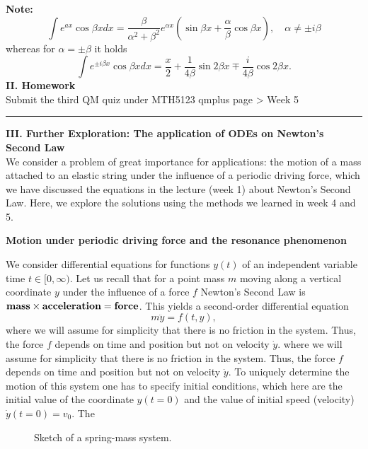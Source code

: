 \documentclass[11pt,a4paper,twoside]{article}
\begin{document}
	\textbf{Note:}
	$$
	\int e^{ax}\cos \beta x dx = \frac{\beta}{\alpha^2+\beta^2}e^{\alpha x}\left(\sin \beta x + \frac{\alpha}{\beta}\cos \beta x\right),\quad \alpha \neq \pm i\beta
	$$
	whereas for $\alpha = \pm \beta$ it holds
	$$
	\int e^{\pm i\beta x} \cos \beta x dx = \frac{x}{2} + \frac{1}{4\beta}\sin 2\beta x \mp \frac{i}{4\beta} \cos 2\beta x.
	$$
	\textbf{II. Homework}\\
	Submit the third QM quiz under MTH5123 qmplus page > Week 5\\
	\rule{\textwidth}{0.4pt}
	\textbf{III. Further Exploration: The application of ODEs on Newton’s Second Law}\\
	We consider a problem of great importance for applications: the motion of a mass attached to an elastic string under the influence of a periodic driving force, which we have discussed the equations in the lecture (week 1) about Newton’s Second Law. Here, we explore the solutions using the methods we learned in week 4 and 5.\par
	\textbf{Motion under periodic driving force and the resonance phenomenon}\par
	We consider differential equations for functions $y(t)$ of an independent variable time $t \in [0,\infty)$. Let us recall that for a point mass $m$ moving along a vertical coordinate $y$ under the influence of a force $f$ Newton’s Second Law is $\textbf{\text{mass}}\times \textbf{\text{acceleration}} = \textbf{\text{force}}$. This yields a second-order differential equation
	$$
	m\ddot{y} = f(t,y),
	$$
	where we will assume for simplicity that there is no friction in the system. Thus, the force $f$ depends on time and position but not on velocity $\dot{y}$. where we will assume for simplicity that there is no friction in the system. Thus, the force $f$ depends on time and position but not on velocity $\dot{y}$. To uniquely determine the motion of this system one has to specify initial conditions, which here are the initial value of the coordinate $y(t = 0)$ and the value of initial speed (velocity) $\dot{y}(t = 0) = v_0$. The
	\begin{figure}[H]
		\centering
		\caption{Sketch of a spring-mass system.}\label{1}
	\end{figure}
\end{document}
